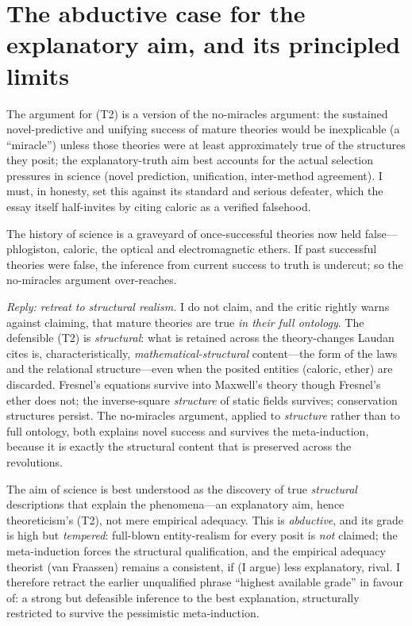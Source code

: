 \documentclass[12pt]{article}
\begin{document}
\section{The abductive case for the explanatory aim, and its principled limits}

The argument for (T2) is a version of the no-miracles argument: the
sustained novel-predictive and unifying success of mature theories would
be inexplicable (a ``miracle'') unless those theories were at least
approximately true of the structures they posit; the explanatory-truth
aim best accounts for the actual selection pressures in science (novel
prediction, unification, inter-method agreement). I must, in honesty, set
this against its standard and serious defeater, which the essay itself
half-invites by citing caloric as a verified falsehood.

\begin{description}[leftmargin=1.6em,style=nextline]
\item[The pessimistic meta-induction (Laudan).] The history of science is
a graveyard of once-successful theories now held false---phlogiston,
caloric, the optical and electromagnetic ethers. If past successful
theories were false, the inference from current success to truth is
undercut; so the no-miracles argument over-reaches.
\end{description}

\noindent\emph{Reply: retreat to structural realism.} I do not claim, and
the critic rightly warns against claiming, that mature theories are true
\emph{in their full ontology}. The defensible (T2) is \emph{structural}:
what is retained across the theory-changes Laudan cites is, characteristically,
\emph{mathematical-structural} content---the form of the laws and the
relational structure---even when the posited entities (caloric, ether) are
discarded. Fresnel's equations survive into Maxwell's theory though
Fresnel's ether does not; the inverse-square \emph{structure} of static
fields survives; conservation structures persist. The no-miracles
argument, applied to \emph{structure} rather than to full ontology, both
explains novel success and survives the meta-induction, because it is
exactly the structural content that is preserved across the revolutions.

\begin{description}[leftmargin=1.6em,style=nextline]
\item[Graded verdict on (T2).] The aim of science is best understood as
the discovery of true \emph{structural} descriptions that explain the
phenomena---an explanatory aim, hence theoreticism's (T2), not mere
empirical adequacy. This is \emph{abductive}, and its grade is high but
\emph{tempered}: full-blown entity-realism for every posit is \emph{not}
claimed; the meta-induction forces the structural qualification, and the
empirical adequacy theorist (van Fraassen) remains a consistent, if (I
argue) less explanatory, rival. I therefore retract the earlier
unqualified phrase ``highest available grade'' in favour of: a strong but
defeasible inference to the best explanation, structurally restricted to
survive the pessimistic meta-induction.
\end{description}
\end{document}
